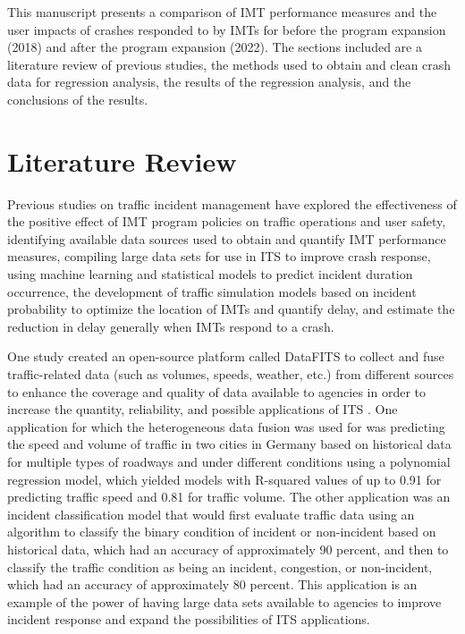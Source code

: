 \documentclass[
  letterpaper,
  authoryear]{elsarticle}
\begin{document}
This manuscript presents a comparison of IMT performance measures and
the user impacts of crashes responded to by IMTs for before the program
expansion (2018) and after the program expansion (2022). The sections
included are a literature review of previous studies, the methods used
to obtain and clean crash data for regression analysis, the results of
the regression analysis, and the conclusions of the results.


\section{Literature Review}\label{literature-review}

Previous studies on traffic incident management have explored the
effectiveness of the positive effect of IMT program policies on traffic
operations and user safety, identifying available data sources used to
obtain and quantify IMT performance measures, compiling large data sets
for use in ITS to improve crash response, using machine learning and
statistical models to predict incident duration occurrence, the
development of traffic simulation models based on incident probability
to optimize the location of IMTs and quantify delay, and estimate the
reduction in delay generally when IMTs respond to a crash.

One study created an open-source platform called DataFITS to collect and
fuse traffic-related data (such as volumes, speeds, weather, etc.) from
different sources to enhance the coverage and quality of data available
to agencies in order to increase the quantity, reliability, and possible
applications of ITS \citep{zisner_datafits_2023}. One application for
which the heterogeneous data fusion was used for was predicting the
speed and volume of traffic in two cities in Germany based on historical
data for multiple types of roadways and under different conditions using
a polynomial regression model, which yielded models with R-squared
values of up to 0.91 for predicting traffic speed and 0.81 for traffic
volume. The other application was an incident classification model that
would first evaluate traffic data using an algorithm to classify the
binary condition of incident or non-incident based on historical data,
which had an accuracy of approximately 90 percent, and then to classify
the traffic condition as being an incident, congestion, or non-incident,
which had an accuracy of approximately 80 percent. This application is
an example of the power of having large data sets available to agencies
to improve incident response and expand the possibilities of ITS
applications.
\end{document}

